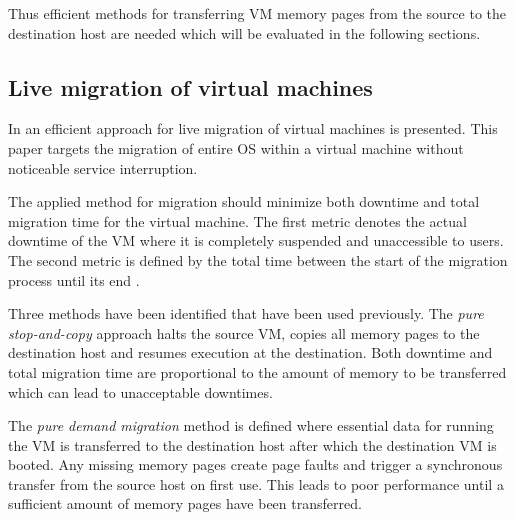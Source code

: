 Thus efficient methods for transferring VM memory pages from the source to the destination host are needed which will be evaluated in the following sections. 
%


\subsection{Live migration of virtual machines}

In \cite{clark2005live} an efficient approach for live migration of virtual machines is presented. This paper targets the migration of entire OS within a virtual machine without noticeable service interruption. 

The applied method for migration should minimize both downtime and total migration time for the virtual machine. The first metric denotes the actual downtime of the VM where it is completely suspended and unaccessible to users. The second metric is defined by the total time between the start of the migration process until its end \cite{clark2005live}. 

Three methods have been identified that have been used previously. The \textit{pure stop-and-copy} approach halts the source VM, copies all memory pages to the destination host and resumes execution at the destination. Both downtime and total migration time are proportional to the amount of memory to be transferred which can lead to unacceptable downtimes. 

The \textit{pure demand migration} method is defined where essential data for running the VM is transferred to the destination host after which the destination VM is booted. Any missing memory pages create page faults and trigger a synchronous transfer from the source host on first use. This leads to poor performance until a sufficient amount of memory pages have been transferred. 

